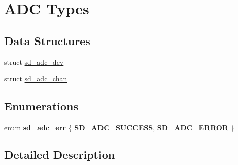 \hypertarget{group___s_d___a_d_c___types}{}\section{A\+DC Types}
\label{group___s_d___a_d_c___types}
\subsection*{Data Structures}
\begin{DoxyCompactItemize}
\item 
struct \mbox{\hyperlink{structsd__adc__dev}{sd\+\_\+adc\+\_\+dev}}
\item 
struct \mbox{\hyperlink{structsd__adc__chan}{sd\+\_\+adc\+\_\+chan}}
\end{DoxyCompactItemize}
\subsection*{Enumerations}
\begin{DoxyCompactItemize}
\item 
\mbox{\label{group___s_d___a_d_c___types_ga923723b73b69a170fe71d7137e57289f}} 
enum {\bfseries sd\+\_\+adc\+\_\+err} \{ {\bfseries S\+D\+\_\+\+A\+D\+C\+\_\+\+S\+U\+C\+C\+E\+SS}, 
{\bfseries S\+D\+\_\+\+A\+D\+C\+\_\+\+E\+R\+R\+OR}
 \}
\end{DoxyCompactItemize}


\subsection{Detailed Description}
